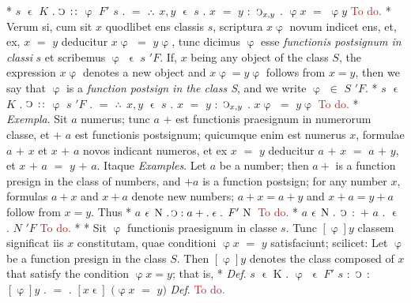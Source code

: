 \documentclass{book}
\newcommand{\C}{\mathop{\sbox0{$\displaystyle$$\reflectbox{C}$} %
\raisebox{-\height+\ht0-0.05cm}[\ht0][\dp0]{\scalebox{0.8}[0.8]{\copy0}}}\displaylimits} %
\newcommand{\pppNoSpace}{\leavevmode\lower0ex\hbox{.}\kern-0.1em\raise0.7ex\hbox{.}\kern-0.1em\lower0ex\hbox{.}} %
\newcommand{\smallIn}{\ensuremath{\mathrel{\epsilon}}}
\newcommand{\N}{\mathop{\thinspace \text{N} \thinspace}}
\newcommand\todo{\textcolor{brown}{To do.}}
\newenvironment{translateTwoCol}
               { %
                 \columnratio{0.5, 0.5} \begin{paracol}{2}
                 \newcommand{\LAT}{\switchcolumn[0]*}
                 \newcommand{\ENG}{\switchcolumn[1]}
               }
               { %
                 \let\ENG\undefined
                 \let\LAT\undefined
                 \end{paracol}
               }
\begin{document}
\begin{translateTwoCol}
\LAT
\hspace{1.06cm} $s$ $\smallIn$ $K$ $.$ $\C$ $:\hspace{0.1em}:$ $\upvarphi$ $F'$ $s$ $.$ $=$ $\pppNoSpace$ $x,y$ $\smallIn$ $s$ $.$ $x$ $=$ $y$ $:$ $\C_{x,y}$ $.$ $\upvarphi x$ $=$ $\upvarphi y$
\ENG
\todo
\LAT
Verum si, cum sit $x$ quodlibet ens classis $s$, scriptura $x\upvarphi$ novum indicet ens, et, ex, $x$ $=$ $y$ deducitur $x\upvarphi$ $=$ $y\upvarphi$, tunc dicimus $\upvarphi$ esse \emph{functionis postsignum in classi} $s$ et scribemus $\upvarphi$ $\smallIn$ $s$ $'F$.
\ENG
If, $x$ being any object of the class $S$, the expression $x\upvarphi$ denotes a new object and $x\upvarphi = y\upvarphi$ follows from $x=y$, then we say that $\upvarphi$ is a \emph{function postsign in the class S}, and we write $\upvarphi$ $\in$ $S$ $'F$.
\LAT
\hspace{1.06cm} $s$ $\smallIn$ $K$ $.$ $\C$ $:\hspace{0.1em}:$ $\upvarphi$ $s$ $'F$ $.$ $=$ $\pppNoSpace$ $x,y$ $\smallIn$ $s$ $.$ $x$ $=$ $y$ $:$ $\C_{x,y}$ $.$ $x\upvarphi$ $=$ $y\upvarphi$
\ENG
\todo
\LAT
\emph{Exempla}. Sit $a$ numerus; tunc $a$ $+$ est functionis praesignum in numerorum classe, et $+$ $a$ est functionis postsignum; quicumque enim est numerus $x$, formulae $a$ $+$ $x$ et $x$ $+$ $a$ novos indicant numeros, et ex $x$ $=$ $y$ deducitur $a$ $+$ $x$ $=$ $a$ $+$ $y$, et $x$ $+$ $a$ $=$ $y$ $+$ $a$. Itaque
\ENG
\emph{Examples}. Let $a$ be a number; then $a+$ is a function presign in the class of numbers, and $+a$ is a function postsign; for any number $x$, formulas $a+x$ and $x+a$ denote new numbers; $a+x=a+y$ and $x+a=y+a$ follow from $x=y$. Thus
\LAT
\hspace{1.06cm} $a$ $\smallIn \N . \C : a + . \smallIn .$ $F' \N$
\ENG
\todo
\LAT
\hspace{1.06cm} $a$ $\smallIn \N .$ $\C$ $:$ $+$ $a$ $.$ $\smallIn$ $.$ $N$ $'F$
\ENG
\todo
\LAT
\hfill
\ENG
\hfill
\LAT
Sit $\upvarphi$ functionis praesignum in classe $s$. Tunc $[\upvarphi] y$ classem significat iis $x$ constitutam, quae conditioni $\upvarphi x$ $=$ $y$ satisfaciunt; scilicet:
\ENG
Let $\upvarphi$ be a function presign in the class $S$. Then $[\upvarphi] y$ denotes the class composed of $x$ that satisfy the condition $\upvarphi x = y$; that is,
\LAT
\emph{Def}. \hspace{0.25cm} $s$ $\smallIn$ K $.$ $\upvarphi$ $\smallIn$ $F'$ $s$ $:$ $\C$ $:$ $[\upvarphi]y$ $.$ $=$ $.$ $[x \smallIn]$ $(\upvarphi x$ $=$ $y)$
\ENG
\emph{Def}. \hspace{0.25cm} \todo
\end{translateTwoCol}
\end{document}
